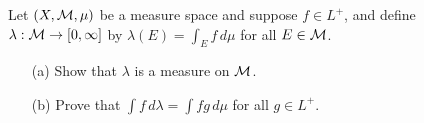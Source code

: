 \color{orange}
\begin{prob}
    Let $(X, {\mathcal{M}}, \mu)$ be a measure space and suppose $f\in L^+$, and define $\lambda: {\mathcal{M}}\rightarrow [0, \infty]$ by $\lambda(E)=\int_E f\,d\mu$ for all $E\in{\mathcal{M}}$.
    \begin{enumerate}
        \item[(a)]
        {
            Show that $\lambda$ is a measure on ${\mathcal{M}}$.
        }
        \item[(b)]
        {
            Prove that $\int f\,d\lambda=\int fg\,d\mu$ for all $g\in L^+$.
        }
    \end{enumerate}
\end{prob}
\color{black}